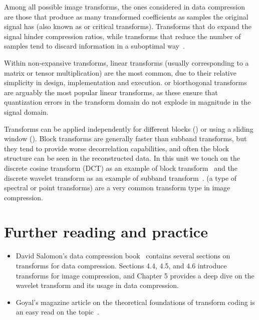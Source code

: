 Among all possible image transforms, the ones considered in data compression are those that produce as many transformed
coeﬃcients as samples the original signal has (also known as  or critical transforms). Transforms that do expand the signal hinder compression ratios, while transforms that reduce the number of samples tend to discard information in a suboptimal way~\cite[\S 4.1.1]{taubman2002jpeg2000}.

Within non-expansive transforms, linear transforms (usually corresponding to a matrix or tensor multiplication) are the most common, due to their relative simplicity in design, implementation and execution.  or biorthogonal transforms are arguably the most popular linear transforms, as these ensure that quantization errors in the transform domain do not explode in magnitude in the signal domain.

Transforms can be applied independently for different blocks () or using a sliding window (). Block transforms are generally faster than subband transforms, but they tend to provide worse decorrelation capabilities, and often the block structure can be seen in the reconstructed data. In this unit we touch on the discrete cosine transform (DCT) as an example of block transform~\cite[\S 13.4.1, \S 13.4.2, \S 13.3]{sayood_introduction} and the discrete wavelet transform as an example of subband transform~\cite[\S 14.1, \S 14.2, \S 14.3, \S 14.4, \S 14.8, \S 15.1, \S 15.2, \S 16]{sayood_introduction}\cite[\S 6.2]{taubman2002jpeg2000}.  (a type of spectral or point transforms) are a very common transform type in image compression.


\section*{Further reading and practice}

\begin{itemize}
\item David Salomon's data compression book~\cite{salomon_compression_complete} contains several sections on transforms for data compression. Sections 4.4, 4.5, and 4.6 introduce transforms for image compression, and Chapter 5 provides a deep dive on the wavelet transform and its usage in data compression.
\vspace{0.1cm}
\item Goyal's magazine article on the theoretical foundations of transform coding is an easy read on the topic~\cite{goyal_transform_coding}.
\end{itemize}

